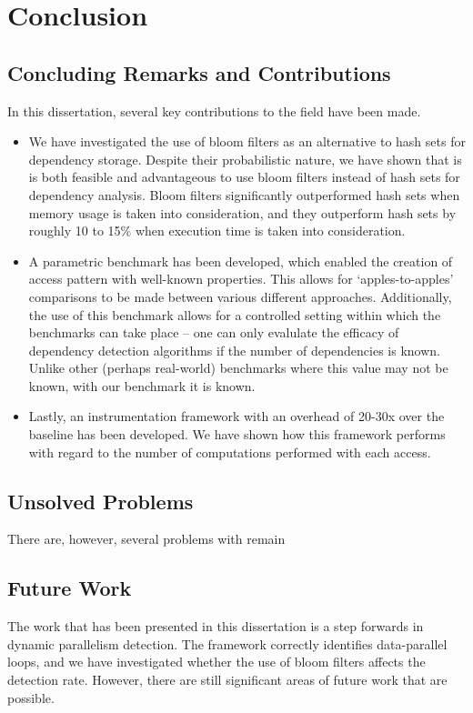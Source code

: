 \chapter{Conclusion} \label{chp:conclusion}
\section{Concluding Remarks and Contributions} \label{sec:conclusion/remarks}
In this dissertation, several key contributions to the field have been made.

\begin{itemize}
	\item We have investigated the use of bloom filters as an alternative to hash sets for dependency storage. Despite their probabilistic nature, we have shown that is is both feasible and advantageous to use bloom filters instead of hash sets for dependency analysis. Bloom filters significantly outperformed hash sets when memory usage is taken into consideration, and they outperform hash sets by roughly 10 to 15\% when execution time is taken into consideration.
	
	\item A parametric benchmark has been developed, which enabled the creation of access pattern with well-known properties. This allows for `apples-to-apples' comparisons to be made between various different approaches. Additionally, the use of this benchmark allows for a controlled setting within which the benchmarks can take place -- one can only evalulate the efficacy of dependency detection algorithms if the number of dependencies is known. Unlike other (perhaps real-world) benchmarks where this value may not be known, with our benchmark it is known.
	
	\item Lastly, an instrumentation framework with an overhead of 20-30x over the baseline has been developed. We have shown how this framework performs with regard to the number of computations performed with each access.
\end{itemize}

\section{Unsolved Problems} \label{sec:conclusion/unsolved}
There are, however, several problems with remain 

\section{Future Work} \label{sec:conclusion/future-work}
The work that has been presented in this dissertation is a step forwards in dynamic parallelism detection. The framework correctly identifies data-parallel loops, and we have investigated whether the use of bloom filters affects the detection rate. However, there are still significant areas of future work that are possible.

